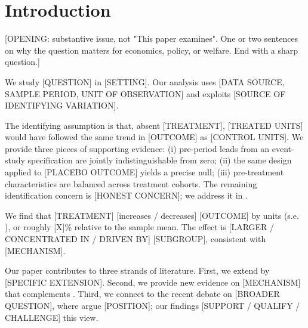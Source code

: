
\section{Introduction}\label{sec:intro}

[OPENING: substantive issue, not "This paper examines". One or two
sentences on why the question matters for economics, policy, or
welfare. End with a sharp question.]

We study [QUESTION] in [SETTING]. Our analysis uses [DATA SOURCE,
SAMPLE PERIOD, UNIT OF OBSERVATION] and exploits [SOURCE OF
IDENTIFYING VARIATION].

The identifying assumption is that, absent [TREATMENT], [TREATED
UNITS] would have followed the same trend in [OUTCOME] as
[CONTROL UNITS]. We provide three pieces of supporting evidence:
(i) pre-period leads from an event-study specification are jointly
indistinguishable from zero; (ii) the same design applied to
[PLACEBO OUTCOME] yields a precise null; (iii) pre-treatment
characteristics are balanced across treatment cohorts. The
remaining identification concern is [HONEST CONCERN]; we address
it in .

We find that [TREATMENT] [increases / decreases] [OUTCOME] by
\headlineEstimate{} units (s.e. \headlineSE{}), or roughly
[X]\% relative to the sample mean. The effect is [LARGER /
CONCENTRATED IN / DRIVEN BY] [SUBGROUP], consistent with [MECHANISM].

Our paper contributes to three strands of literature. First, we
extend \citet{Author2020} by [SPECIFIC EXTENSION]. Second, we
provide new evidence on [MECHANISM] that complements
\citet{Other2019}. Third, we connect to the recent debate on
[BROADER QUESTION], where \citet{Third2022} argue [POSITION];
our findings [SUPPORT / QUALIFY / CHALLENGE] this view.

